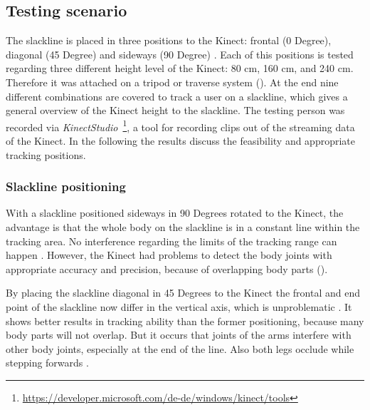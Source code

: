 \subsection{Testing scenario}

The slackline is placed in three positions to the Kinect: frontal (0 Degree), diagonal (45 Degree) and sideways (90 Degree) \textbf{}. Each of this positions is tested regarding three different height level of the Kinect: 80 cm, 160 cm, and 240 cm. Therefore it was attached on a tripod or traverse system (\textbf{}). At the end nine different combinations are covered to track a user on a slackline, which gives a general overview of the Kinect height to the slackline. The testing person was recorded via \textit{KinectStudio}~\footnote{\url{https://developer.microsoft.com/de-de/windows/kinect/tools}}, a tool for recording clips out of the streaming data of the Kinect. In the following the results discuss the feasibility and appropriate tracking positions.

\subsubsection{Slackline positioning}
With a slackline positioned sideways in 90 Degrees rotated to the Kinect, the advantage is that the whole body on the slackline is in a constant line within the tracking area. No interference regarding the limits of the tracking range can happen \textbf{}. However, the Kinect had problems to detect the body joints with appropriate accuracy and precision, because of overlapping body parts (\textbf{}).

By placing the slackline diagonal in 45 Degrees to the Kinect the frontal and end point of the slackline now differ in the vertical axis, which is unproblematic  \textbf{}. 
It shows better results in tracking ability than the former positioning, because many body parts will not overlap. But it occurs that joints of the arms interfere with other body joints, especially at the end of the line. Also both legs occlude while stepping forwards \textbf{}. 

